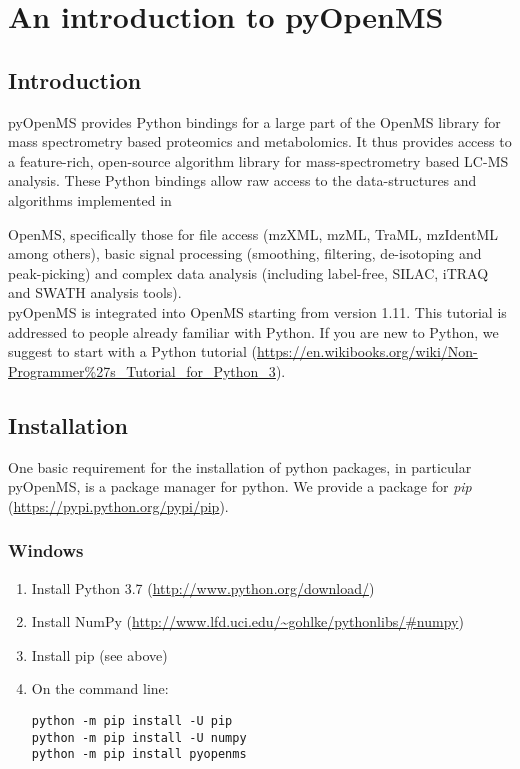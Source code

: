 
\newpage
\section{An introduction to pyOpenMS}

\subsection{Introduction}
pyOpenMS provides Python bindings for a large part of the OpenMS library for mass spectrometry based proteomics and metabolomics. It thus provides access to a feature-rich, open-source algorithm library for mass-spectrometry based LC-MS analysis. These Python bindings allow raw access to the data-structures and algorithms implemented in {OpenMS, specifically those for file access (mzXML, mzML, TraML, mzIdentML among others), basic signal processing (smoothing, filtering, de-isotoping and peak-picking) and complex data analysis (including label-free, SILAC, iTRAQ and SWATH analysis tools).\\

\noindent pyOpenMS is integrated into OpenMS starting from version 1.11. This tutorial is addressed to people already familiar with Python. If you are new to Python, we suggest to start with a Python tutorial (\url{https://en.wikibooks.org/wiki/Non-Programmer%27s_Tutorial_for_Python_3}).

\subsection{Installation}
One basic requirement for the installation of python packages, in particular pyOpenMS, is a package manager for python. We provide a package for \textit{pip} (\url{https://pypi.python.org/pypi/pip}).

\subsubsection{Windows}
\begin{enumerate}
  \item Install Python 3.7 (\url{http://www.python.org/download/})
  \item Install NumPy (\url{http://www.lfd.uci.edu/~gohlke/pythonlibs/#numpy})
  \item Install pip (see above)
  \item On the command line:
    \begin{code}
	\begin{verbatim}
python -m pip install -U pip
python -m pip install -U numpy
python -m pip install pyopenms
    \end{verbatim}
	\end{code}
\end{enumerate}

}
